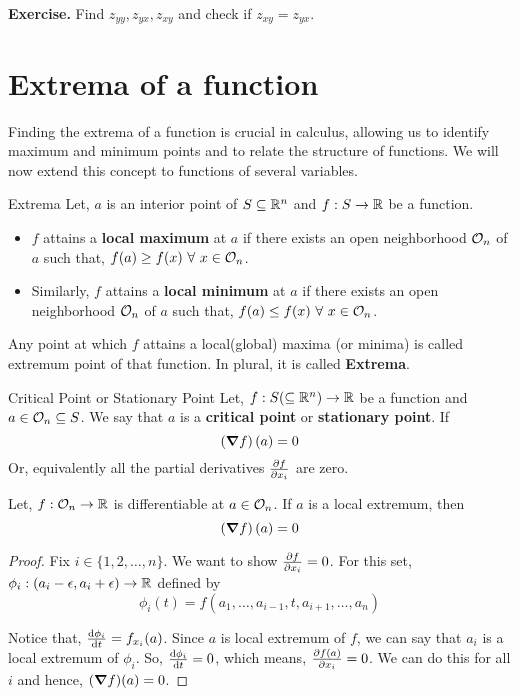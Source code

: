 \documentclass[../Analysis-3.tex]{subfiles}
\begin{document}
\textbf{Exercise.} Find $z_{yy}, z_{yx}, z_{xy}$ and check if $z_{xy} = z_{yx}$.

\section{Extrema of a function}

Finding the extrema of a function is crucial in calculus, allowing us to identify maximum and minimum points and to relate the structure of functions. We will now extend this concept to functions of several variables.

\begin{Def}{Extrema}{}
    Let, $a$ is an interior point of $S \subseteq \mathbb{R}^n$ and $f : S \to \mathbb{R}$ be a function.

    \begin{itemize}
        \item $f$ attains a \textbf{local maximum} at $a$ if there exists an open neighborhood $\mathcal{O}_{n}$ of $a$ such that, $f(a) \geq f(x)\ \forall\ x \in \mathcal{O}_{n}$.
        \item Similarly, $f$ attains a \textbf{local minimum} at $a$ if there exists an open neighborhood $\mathcal{O}_{n}$ of $a$ such that, $f(a) \leq f(x)\ \forall\ x \in \mathcal{O}_{n}$.
    \end{itemize}

    Any point at which $f$ attains a local(global) maxima (or minima)  is called extremum point of that function. In plural, it is called \textbf{Extrema}.
\end{Def}

\begin{Def}{Critical Point or Stationary Point}{}
    Let, $f : S (\subseteq \mathbb{R}^n) \to \mathbb{R}$ be a function and $a \in \mathcal{O}_{n} \subseteq S$. We say that $a$ is a \textbf{critical point} or \textbf{stationary point}.
    If \[ \left(\grad f\right)(a) = 0\]
    Or, equivalently all the partial derivatives $\pdv{f}{x_i}$ are zero.
\end{Def}

\begin{Thm}{}{}
    Let, $f: \mathcal{O}_{n} \to \mathbb{R}$ is differentiable at $a \in \mathcal{O}_{n}$. If $a$ is a local extremum, then \[ \left(\grad f\right)(a) = 0 \]
\end{Thm}

\begin{proof}
    Fix $i \in \{1,2, \ldots, n\}$. We want to show $\pdv{f}{x_i} = 0$. For this set, $\phi_i : (a_i - \epsilon, a_i + \epsilon) \to \mathbb{R}$ defined by $$ \phi_i(t) = f(a_1, \ldots, a_{i-1}, t, a_{i+1}, \ldots, a_n)$$

    Notice that, $\dv{\phi_i}{t}(a_i) = f_{x_i}(a)$. Since $a$ is local extremum of $f$, we can say that $a_i$ is a local extremum of $\phi_i$. So, $\dv{\phi_i}{t}(a_i) = 0$, which means, $\pdv{f(a)}{x_i} = 0$. We can do this for all $i$ and hence, $(\grad f)(a) = 0$.
\end{proof}
\end{document}
